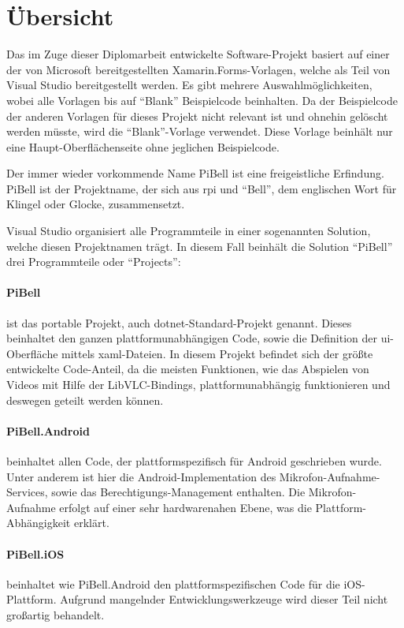 \label{ch:prog-doc}
\section{Übersicht}
Das im Zuge dieser Diplomarbeit entwickelte Software-Projekt basiert auf einer der von Microsoft bereitgestellten Xamarin.Forms-Vorlagen, welche als Teil von Visual Studio bereitgestellt werden.
Es gibt mehrere Auswahlmöglichkeiten, wobei alle Vorlagen bis auf \enquote{Blank} Beispielcode beinhalten.
Da der Beispielcode der anderen Vorlagen für dieses Projekt nicht relevant ist und ohnehin gelöscht werden müsste, wird die \enquote{Blank}-Vorlage verwendet.
Diese Vorlage beinhält nur eine Haupt-Oberflächenseite ohne jeglichen Beispielcode.

Der immer wieder vorkommende Name PiBell ist eine freigeistliche Erfindung. PiBell ist der Projektname, der sich aus \acl{rpi} und \enquote{Bell}, dem englischen Wort für Klingel oder Glocke, zusammensetzt.

Visual Studio organisiert alle Programmteile in einer sogenannten Solution, welche diesen Projektnamen trägt. In diesem Fall beinhält die Solution \enquote{PiBell} drei Programmteile oder \enquote{Projects}:
\paragraph{PiBell} ist das portable Projekt, auch \acs{dotnet}-Standard-Projekt genannt.
Dieses beinhaltet den ganzen plattformunabhängigen Code, sowie die Definition der \acs{ui}-Oberfläche mittels \acs{xaml}-Dateien.
In diesem Projekt befindet sich der größte entwickelte Code-Anteil, da die meisten Funktionen, wie das Abspielen von Videos mit Hilfe der LibVLC-Bindings, plattformunabhängig funktionieren und deswegen geteilt werden können.

\paragraph{PiBell.Android} beinhaltet allen Code, der plattformspezifisch für Android geschrieben wurde.
Unter anderem ist hier die Android-Implementation des Mikrofon-Auf\-nahme-Services, sowie das Berechtigungs-Management enthalten.
Die Mikrofon-Aufnahme erfolgt auf einer sehr hardwarenahen Ebene, was die Plattform-Abhängigkeit erklärt.

\paragraph{PiBell.iOS} beinhaltet wie PiBell.Android den plattformspezifischen Code für die iOS-Platt\-form. Aufgrund mangelnder Entwicklungswerkzeuge wird dieser Teil nicht großartig behandelt.\par

